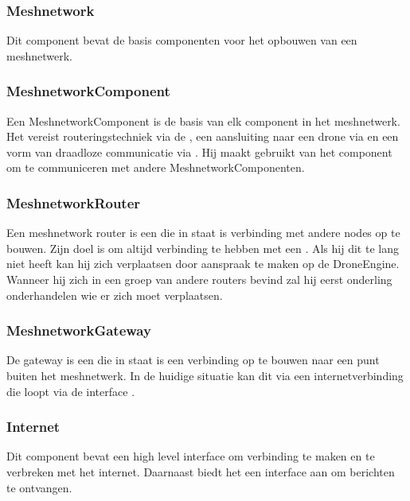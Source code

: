 \documentclass[a4paper, 11pt, oneside]{report}
\begin{document}
\subsubsection{Meshnetwork}
\label{architectural:subcomponenten:Meshnetwork}
Dit component bevat de basis componenten voor het opbouwen van een meshnetwerk.

\subsubsection{MeshnetworkComponent}

\label{architectural:subcomponenten:MeshnetworkComponent}
Een MeshnetworkComponent is de basis van elk component in het meshnetwerk.
Het vereist routeringstechniek via de , een aansluiting naar een drone via  en een vorm van draadloze communicatie via .
Hij maakt gebruikt van het component  om te communiceren met andere MeshnetworkComponenten.

\subsubsection{MeshnetworkRouter}
\label{architectural:subcomponenten:MeshnetworkRouter}
Een meshnetwork router is een  die in staat is verbinding met andere nodes op te bouwen.
Zijn doel is om altijd verbinding te hebben met een .
Als hij dit te lang niet heeft kan hij zich verplaatsen door aanspraak te maken op de DroneEngine.
Wanneer hij zich in een groep van andere routers bevind zal hij eerst onderling onderhandelen wie er zich moet verplaatsen.

\subsubsection{MeshnetworkGateway}
\label{architectural:subcomponenten:MeshnetworkGateway}
De gateway is een  die in staat is een verbinding op te bouwen naar een punt buiten het meshnetwerk. In de huidige situatie kan dit via een internetverbinding die loopt via de interface . 

\subsubsection{Internet}
\label{architectural:subcomponenten:Internet}
Dit component bevat een high level interface om verbinding te maken en te verbreken met het internet.
Daarnaast biedt het een interface aan om berichten te ontvangen.
\end{document}
